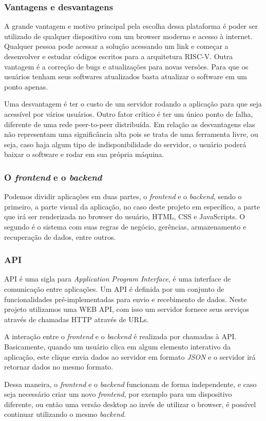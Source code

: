		\subsubsection{Vantagens e desvantagens}

			A grande vantagem e motivo principal pela escolha dessa plataforma é poder ser utilizado de qualquer dispositivo com um browser moderno e acesso à internet. Qualquer pessoa pode acessar a solução acessando um link e começar a desenvolver e estudar códigos escritos para a arquitetura RISC-V. 
			Outra vantagem é a correção de bugs e atualizações para novas versões. Para que os usuários tenham seus softwares atualizados basta atualizar o software em um ponto apenas.

			Uma desvantagem é ter o custo de um servidor rodando a aplicação para que seja acessível por vários usuários. Outro fator crítico é ter um único ponto de falha, diferente de uma rede peer-to-peer distribuída.
			Em relação as desvantagens elas não representam uma significância alta pois se trata de uma ferramenta livre, ou seja, caso haja algum tipo de indisponibilidade do servidor, o usuário poderá baixar o software e rodar em sua própria máquina. 


		
		\subsubsection{O \textit{frontend} e o \textit{backend}}
			Podemos dividir aplicações em duas partes, o \textit{frontend} e o \textit{backend}, sendo o primeiro, a parte visual da aplicação, no caso deste projeto em específico, a parte que irá ser renderizada no browser do usuário, HTML, CSS e JavaScripts. O segundo é o sistema com suas regras de negócio, gerências, armazenamento e recuperação de dados, entre outros.

		\subsubsection{API}

			API é uma sigla para \textit{Application Program Interface}, é uma interface de comunicação entre aplicações. Um API é definida por um conjunto de funcionalidades pré-implementadas para envio e recebimento de dados. Neste projeto utilizamos uma WEB API, com isso um servidor fornece seus serviços através de chamadas HTTP através de URLs.

			A interação entre o \textit{frontend} e o \textit{backend} é realizada por chamadas à API. Basicamente, quando um usuário clica em algum elemento interativo da aplicação, este clique envia dados ao servidor em formato \textit{JSON} e o servidor irá retornar dados no mesmo formato.

			Dessa maneira, o \textit{frontend} e o \textit{backend} funcionam de forma independente, e caso seja necessário criar um novo \textit{frontend}, por exemplo para um dispositivo diferente, ou então uma versão desktop ao invés de utilizar o browser, é possível continuar utilizando o mesmo \textit{backend}.

